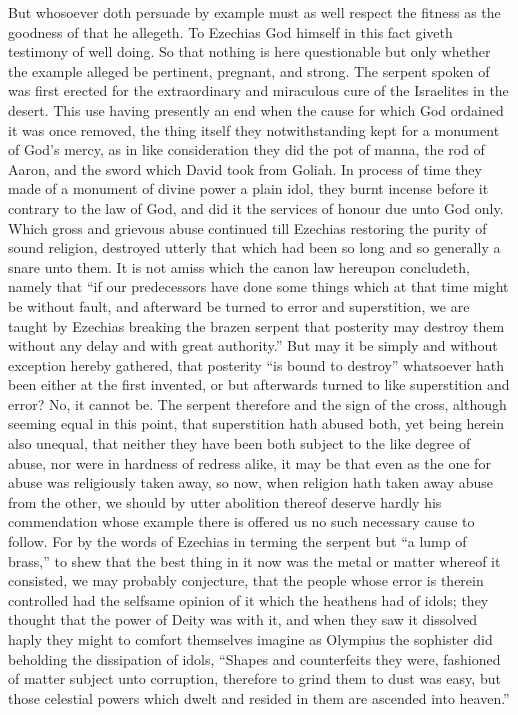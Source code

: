 But whosoever doth persuade by example must as well respect the fitness as the goodness of that he allegeth. To Ezechias God himself in this fact giveth testimony of well doing. So that nothing is here questionable but only whether the example alleged be pertinent, pregnant, and strong.
The serpent spoken of was first erected for the extraordinary and miraculous cure of the Israelites in the desert. This use having presently an end when the cause for which God  ordained it was once removed, the thing itself they notwithstanding kept for a monument of God’s mercy, as in like consideration they did the pot of manna, the rod of Aaron, and the sword which David took from Goliah.
 In process of time they made of a monument of divine power a plain idol, they burnt incense before it contrary to the law of God, and did it the services of honour due unto God only. Which gross and grievous abuse continued till Ezechias restoring the purity of sound religion, destroyed utterly that which had been so long and so generally a snare unto them.
It is not amiss which the canon law hereupon concludeth, namely that “if our predecessors have done some things which at that time might be without fault, and afterward be turned to error and superstition, we are taught by Ezechias breaking the brazen serpent that posterity may destroy them without any delay and with great authority.” But may it be simply and without exception hereby gathered, that posterity “is bound to destroy” whatsoever hath been either at the first invented, or but afterwards turned to like superstition and error? No, it cannot be.
The serpent therefore and the sign of the cross, although seeming equal in this point, that superstition hath abused both, yet being herein also unequal, that neither they have been both subject to the like degree of abuse, nor were in hardness of redress alike, it may be that even as the one for abuse was religiously taken away, so now, when religion hath taken away abuse from the other, we should by utter abolition thereof deserve hardly his commendation whose example there is offered us no such necessary cause to follow.
For by the words of Ezechias in terming the serpent but “a lump of brass,” to shew that the best thing in it now was the metal or matter whereof it consisted, we may probably conjecture, that the people whose error is therein controlled had the selfsame opinion of it which the heathens had of  idols; they thought that the power of Deity was with it, and when they saw it dissolved haply they might to comfort themselves imagine as Olympius the sophister did beholding the dissipation of idols, “Shapes and counterfeits they were, fashioned of matter subject unto corruption, therefore to grind them to dust was easy, but those celestial powers which dwelt and resided in them are ascended into heaven.”
